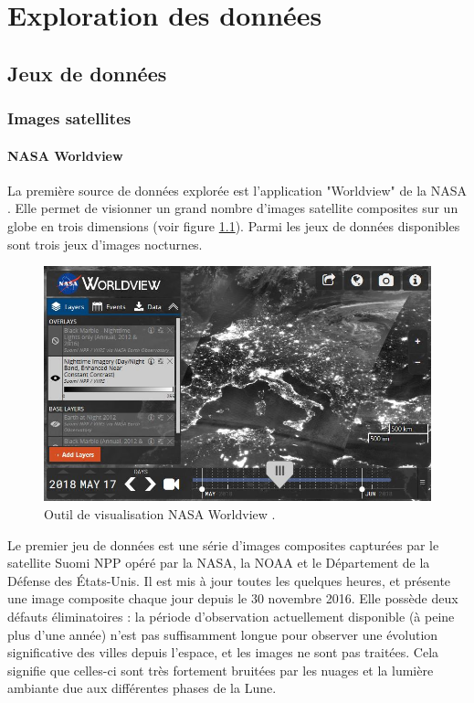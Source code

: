 \documentclass[a4paper, 11pt]{report}
\begin{document}
\chapter{Exploration des données}
\section{Jeux de données}
\subsection{Images satellites}
\subsubsection{NASA Worldview}
La première source de données explorée est l'application "Worldview" de la NASA \cite{nasa-worldview}. Elle permet de visionner un grand nombre d'images satellite composites sur un globe en trois dimensions (voir figure \ref{nasa-worldview-screenshot}). Parmi les jeux de données disponibles sont trois jeux d'images nocturnes.

\begin{figure}[h]
	\centering
	\includegraphics[width=1.0\textwidth]{img/worldview.JPG}
	\caption{Outil de visualisation NASA Worldview \cite{nasa-worldview}.}
	\label{nasa-worldview-screenshot}
\end{figure}

Le premier jeu de données est une série d'images composites capturées par le satellite Suomi NPP opéré par la NASA, la NOAA et le Département de la Défense des États-Unis. Il est mis à jour toutes les quelques heures, et présente une image composite chaque jour depuis le 30 novembre 2016. Elle possède deux défauts éliminatoires : la période d'observation actuellement disponible (à peine plus d'une année) n'est pas suffisamment longue pour observer une évolution significative des villes depuis l'espace, et les images ne sont pas traitées. Cela signifie que celles-ci sont très fortement bruitées par les nuages et la lumière ambiante due aux différentes phases de la Lune.
\end{document}
